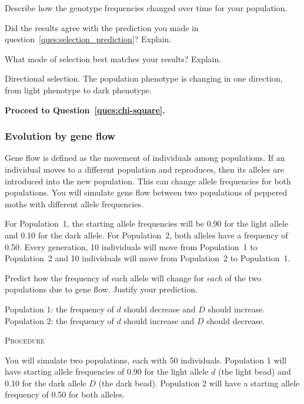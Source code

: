\documentclass[12pt, hidelinks]{exam}
\newcommand*\AnswerBox[2]{%
    \parbox[t][#1]{0.92\textwidth}{%
    \begin{solution}#2\end{solution}}
    \vspace{\stretch{1}}
}
\newlength{\basespace}
\newcommand{\allele}[1]{$#1$}
\begin{document}
\begin{questions}

\question
Describe how the genotype frequencies changed over time for your population.

\AnswerBox{0.5\basespace}{%
}

\question
Did the results agree with the prediction you made in question~\ref{ques:selection_prediction}? Explain.

\AnswerBox{0.5\basespace}{%
}

\question[Checkout]
What mode of selection best matches your results? Explain.

\AnswerBox{0.5\basespace}{Directional selection. The population phenotype is changing in one direction, from light phenotype to dark phenotype.}

\textbf{Proceed to Question~\ref{ques:chi-square}.}
	
\subsubsection*{Evolution by gene flow}\label{sec:gene_flow}

Gene flow is defined as the movement of individuals among populations.  If an individual moves to a different population and reproduces, then its alleles are introduced into the new population.  This can change allele frequencies for both populations. You will simulate gene flow between two populations of peppered moths with different allele frequencies. 

For Population~1, the starting allele frequencies will be 0.90 for the light allele and 0.10 for the dark allele. For Population~2, both alleles have a frequency of 0.50. Every generation, 10 individuals will move from Population~1 to Population~2 and 10 individuals will move from Population~2 to Population~1.

\question\label{ques:migration_prediction}
Predict how the frequency of each allele will change for \emph{each} of the two populations due to gene flow. Justify your prediction.

\AnswerBox{3\baselineskip}{Population 1: the frequency of \allele{d} should decrease and \allele{D} should increase. Population 2: the frequency of \allele{d} should increase and \allele{D} should decrease.}

\textsc{Procedure}

\medskip

You will simulate two populations, each with 50 individuals. Population 1 will have starting allele frequencies of 0.90 for the light allele \allele{d} (the light bead) and 0.10 for the dark allele \allele{D} (the dark bead). Population 2 will have a starting allele frequency of 0.50 for both alleles. 


\end{questions}
\end{document}
